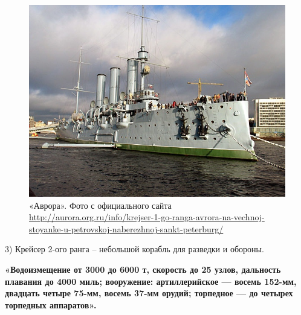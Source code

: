 \begin{figure}[h!tb] 
	\centering\includegraphics[scale=0.5]{Data/RYAV_sily_storon/o2cXT_E28cA.jpg}
	\caption{«Аврора». Фото с официального сайта \url{http://aurora.org.ru/info/krejser-1-go-ranga-avrora-na-vechnoj-stoyanke-u-petrovskoj-naberezhnoj-sankt-peterburg/}
	}%
\end{figure}

3) Крейсер 2-ого ранга – небольшой корабль для разведки и обороны.

\textbf{«Водоизмещение от 3000 до 6000 т, скорость до 25 узлов, дальность плавания до 4000 миль; вооружение: артиллерийское — восемь 152-мм, двадцать четыре 75-мм, восемь 37-мм орудий; торпедное — до четырех торпедных аппаратов».}

